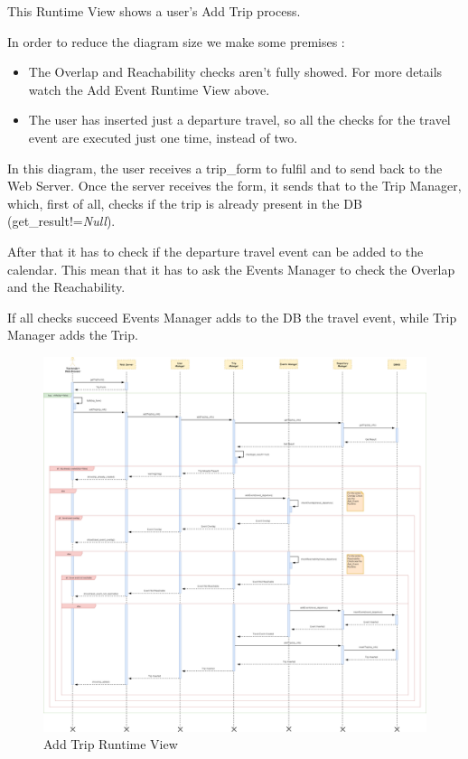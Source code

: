 This Runtime View shows a user's Add Trip process.\par
In order to reduce the diagram size we make some premises :
\begin{itemize}
	\setlength{\leftskip}{1cm}
	\item The Overlap and Reachability checks aren’t fully showed. For more details watch the Add Event Runtime View above.
	\item The user has inserted just a departure travel, so all the checks for the travel event are executed just one time, instead of two.
\end{itemize}\par
In this diagram, the user receives a trip\_form to fulfil and to send back to the Web Server.
Once the server receives the form, it sends that to the Trip Manager, which, first of all, checks if the trip is already present in the DB (get\_result!=\emph{Null}).\par
After that it has to check if the departure travel event can be added to the calendar. This mean that it has to ask the Events Manager to check the Overlap and the Reachability.\par
If all checks succeed Events Manager adds to the DB the travel event, while Trip Manager adds the Trip.
\begin{figure}[H]
	\centering
	\includegraphics[scale=0.165]{Images/Runtime/Add_Trip}
	\caption{Add Trip Runtime View}
\end{figure}

